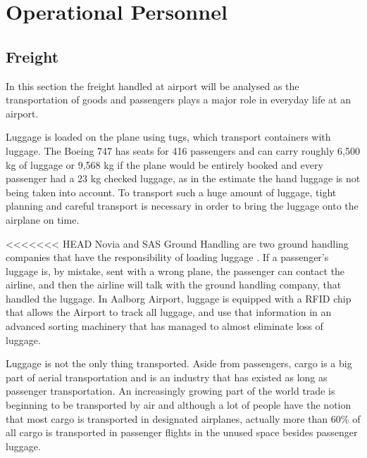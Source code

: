 \section{Operational Personnel}
\subsection{Freight}
In this section the freight handled at airport will be analysed as the transportation of goods and passengers plays a major role in everyday life at an airport. 

Luggage is loaded on the plane using tugs, which transport containers with luggage. The Boeing 747 has seats for 416 passengers\cite{freight_boing} and can carry roughly 6,500 kg of luggage or 9,568 kg if the plane would be entirely booked and every passenger had a 23 kg checked luggage, as in the estimate the hand luggage is not being taken into account. To transport such a huge amount of luggage, tight planning and careful transport is necessary in order to bring the luggage onto the airplane on time.

<<<<<<< HEAD
Novia and SAS Ground Handling are two ground handling companies that have the responsibility of loading luggage \cite{mistet_bagage}. If a passenger's luggage is, by mistake, sent with a wrong plane, the passenger can contact the airline, and then the airline will talk with the ground handling company, that handled the luggage. In Aalborg Airport, luggage is equipped with a RFID chip that allows the Airport to track all luggage, and use that information in an advanced sorting machinery that has managed to almost eliminate loss of luggage.


Luggage is not the only thing transported. Aside from passengers, cargo is a big part of aerial transportation and is an industry that has existed as long as passenger transportation. An increasingly growing part of the world trade is beginning to be transported by air and although a lot of people have the notion that most cargo is transported in designated airplanes, actually more than 60\% of all cargo is transported in passenger flights in the unused space besides passenger luggage. %


